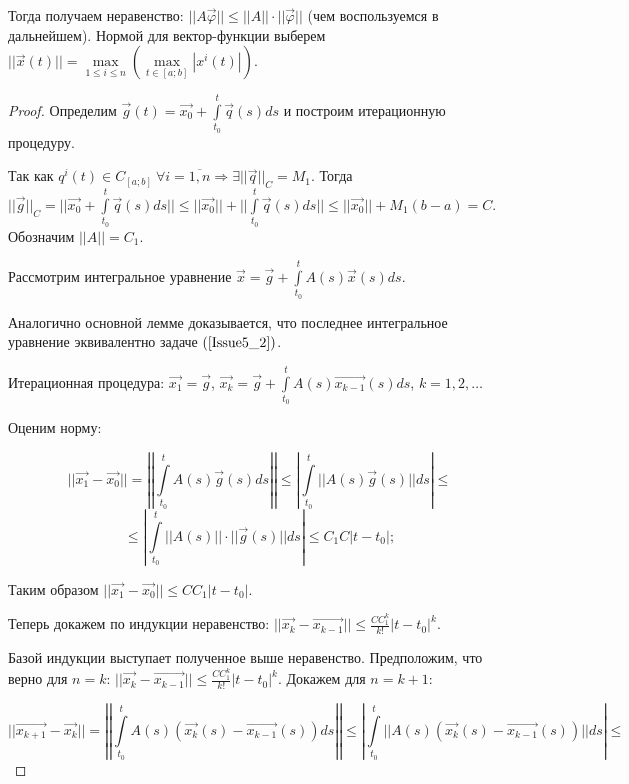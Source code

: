 Тогда получаем неравенство: $||A \overrightarrow{\varphi}|| \leqslant ||A|| \cdot ||\overrightarrow{\varphi}||$ (чем воспользуемся в дальнейшем).
Нормой для вектор-функции выберем $||\overrightarrow{x}(t)|| = \max\limits_{1 \leqslant i \leqslant n} (\max\limits_{t \in [a;b]} |x^i(t)|)$.

\begin{proof}
	Определим $\overrightarrow{g}(t) = \overrightarrow{x_0} + \int\limits_{t_0}^{t} \overrightarrow{q}(s)ds$ и построим итерационную процедуру.

	Так как $q^i(t) \in C_{[a;b]}\ \forall i = \overline{1, n} \Rightarrow \exists ||\overrightarrow{q}||_C = M_1.$ Тогда $||\overrightarrow{g}||_C = \Big| \Big|\overrightarrow{x_0} + \int\limits_{t_0}^{t}\overrightarrow{q}(s)ds \Big| \Big| \leqslant ||\overrightarrow{x_0}|| + \Big| \Big| \int\limits_{t_0}^{t}\overrightarrow{q}(s)ds \Big| \Big| \leqslant ||\overrightarrow{x_0}|| + M_1(b-a) = C$. Обозначим $||A|| = C_1$.

	Рассмотрим интегральное уравнение $\overrightarrow{x} = \overrightarrow{g} + \int\limits_{t_0}^{t}A(s)\overrightarrow{x}(s)ds$.

	Аналогично основной лемме доказывается, что последнее интегральное уравнение эквивалентно задаче $(\ref{Issue5_2})$.

	Итерационная процедура: $\overrightarrow{x_1} = \overrightarrow{g}$, $\overrightarrow{x_k} = \overrightarrow{g} + \int\limits_{t_0}^{t} A(s)\overrightarrow{x_{k-1}}(s)ds $, $k = 1, 2, \dots$

	Оценим норму:

	$$ ||\overrightarrow{x_1} - \overrightarrow{x_0}|| = \left| \left| \int\limits_{t_0}^{t} A(s)\overrightarrow{g}(s)ds \right| \right| \leqslant \left| \int\limits_{t_0}^{t} || A(s)\overrightarrow{g}(s) || ds \right| \leqslant $$
	$$\leqslant \left| \int\limits_{t_0}^{t} || A(s) || \cdot || \overrightarrow{g}(s) || ds \right| \leqslant C_1 C |t - t_0|;$$ 

	Таким образом $||\overrightarrow{x_1} -\overrightarrow{x_0}|| \leqslant CC_1|t-t_0|.$

	Теперь докажем по индукции неравенство: $||\overrightarrow{x_k} - \overrightarrow{x_{k-1}}|| \leqslant \frac{CC_1^k}{k!}|t-t_0|^k.$

	Базой индукции выступает полученное выше неравенство. Предположим, что верно для $n = k$: $||\overrightarrow{x_k} - \overrightarrow{x_{k-1}}|| \leqslant \frac{CC_1^k}{k!}|t-t_0|^k$. Докажем для $n = k + 1$:

	\[ || \overrightarrow{x_{k+1}} - \overrightarrow{x_{k}} || = \left| \left| \int\limits_{t_0}^{t} A(s)(\overrightarrow{x_k}(s) - \overrightarrow{x_{k-1}}(s))ds \right| \right| \leqslant \left| \int\limits_{t_0}^{t} ||A(s)(\overrightarrow{x_k}(s) - \overrightarrow{x_{k-1}}(s))|| ds \right| \leqslant \]


\end{proof}
